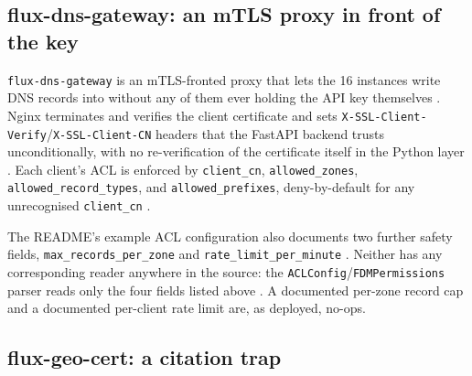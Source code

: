 \subsection{flux-dns-gateway: an mTLS proxy in front of the \PDNS key}
\label{sec:networking-gateway}

\texttt{flux-\allowbreak{}dns-\allowbreak{}gateway} is an mTLS-fronted proxy that lets the 16 \FDM instances write DNS
records into \PDNS without any of them ever holding the \PDNS API key themselves
. Nginx terminates and verifies the client certificate and
sets \texttt{X-\allowbreak{}SSL-\allowbreak{}Client-\allowbreak{}Verify}\slash\texttt{X-\allowbreak{}SSL-\allowbreak{}Client-\allowbreak{}CN} headers that the FastAPI backend trusts
unconditionally, with no re-verification of the certificate itself in the Python layer
. Each client's ACL is
enforced by \texttt{client\_cn}, \texttt{allowed\_zones}, \texttt{allowed\_record\_types}, and
\texttt{allowed\_prefixes}, deny-by-default for any unrecognised \texttt{client\_cn}
. \shipped

The README's example ACL configuration also documents two further safety fields,
\texttt{max\_records\_per\_zone} and \texttt{rate\_limit\_per\_minute}
. Neither has any corresponding reader anywhere in the
source: the \texttt{ACLConfig}\slash\texttt{FDMPermissions} parser reads only the four fields listed
above . A documented per-zone
record cap and a documented per-client rate limit are, as deployed, no-ops. \shipped

\subsection{flux-geo-cert: a citation trap}
\label{sec:networking-geocert}


